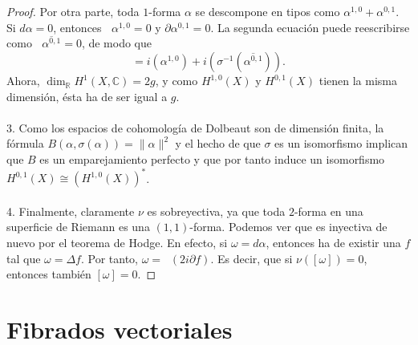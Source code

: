 \documentclass[autocontact]{gaceta}
\theoremstyle{definition} \newtheorem{defn}[thm]{Definición}
\theoremstyle{definition} \newtheorem{ejemplo}[thm]{Ejemplo}
\theoremstyle{definition} \newtheorem{ejercicio}[thm]{Ejercicio}
\def\CC{\mathbb{C}}
\def\RR{\mathbb{R}}
\DeclareMathOperator{\delbar}{\bar{\partial}}
\begin{document}
\begin{proof}
	Por otra parte, toda $1$-forma $\alpha$ se descompone en tipos como $\alpha^{1,0} + \alpha^{0,1}$. Si $d\alpha =0$, entonces $\delbar \alpha^{1,0} =0$ y $\partial \alpha^{0,1}=0$. La segunda ecuación puede reescribirse como $\delbar \overline{\alpha^{0,1}} = 0$, de modo que
	\begin{equation*}
	  [\alpha] = i(\alpha^{1,0}) + i(\sigma^{-1}(\overline{\alpha^{0,1}})).
	\end{equation*}
	Ahora, $\dim_{\RR} H^1(X,\CC) = 2g$, y como $H^{1,0}(X)$ y $H^{0,1}(X)$ tienen la misma dimensión, ésta ha de ser igual a $g$. \ \\
	\ \\
	3. Como los espacios de cohomología de Dolbeaut son de dimensión finita, la fórmula $B(\alpha, \sigma(\alpha)) = \lVert \alpha \rVert ^2$ y el hecho de que $\sigma$ es un isomorfismo implican que $B$ es un emparejamiento perfecto y que por tanto induce un isomorfismo $H^{0,1}(X) \cong (H^{1,0}(X))^*$. \ \\
	\ \\
	4. Finalmente, claramente $\nu$ es sobreyectiva, ya que toda $2$-forma en una superficie de Riemann es una $(1,1)$-forma. Podemos ver que es inyectiva de nuevo por el teorema de Hodge. En efecto, si $\omega=d\alpha$, entonces ha de existir una $f$ tal que $\omega=\Delta f$. Por tanto, $\omega = \delbar(2i\partial f)$. Es decir, que si $\nu([\omega])=0$, entonces también $[\omega]=0$.
      \end{proof}

      \section{Fibrados vectoriales}
 
\end{document}

